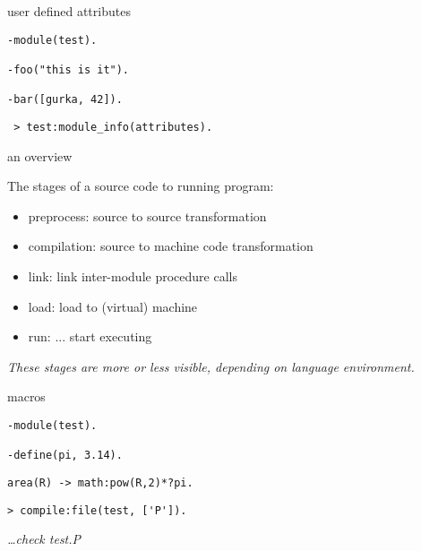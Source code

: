 \begin{frame}[fragile]{user defined attributes}
\begin{verbatim}
-module(test).

-foo("this is it").

-bar([gurka, 42]).
\end{verbatim}
\pause
 \vspace{20pt}
\begin{verbatim}
 > test:module_info(attributes).
\end{verbatim}


\end{frame}

\begin{frame}[fragile]{an overview}

The stages of a source code to running program:
\pause
\begin{itemize}
\item preprocess: source to source transformation
\pause
\item compilation: source to machine code transformation
\pause
\item link: link inter-module procedure calls
\pause
\item load: load to (virtual) machine 
\pause
\item run: ... start executing
\end{itemize}
\pause \vspace{20pt}

{\em These stages are more or less visible, depending on language environment.}

\end{frame}

\begin{frame}[fragile]{macros}

\begin{verbatim}
-module(test).

-define(pi, 3.14).
\end{verbatim}

\pause
\begin{verbatim}
area(R) -> math:pow(R,2)*?pi.
\end{verbatim}
\pause

\pause
\begin{verbatim}
> compile:file(test, ['P']).
\end{verbatim}

\pause\vspace{20pt}

{\em \ldots check test.P}

\end{frame}


